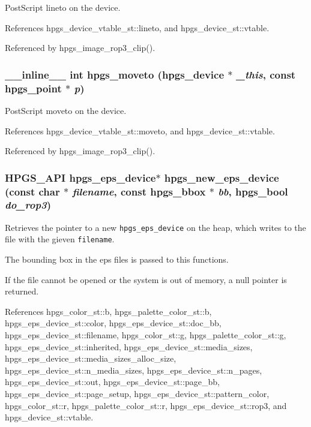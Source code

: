 PostScript lineto on the device. 

References hpgs\_\-device\_\-vtable\_\-st::lineto, and hpgs\_\-device\_\-st::vtable.

Referenced by hpgs\_\-image\_\-rop3\_\-clip().
\subsubsection[hpgs\_\-moveto]{\setlength{\rightskip}{0pt plus 5cm}\_\-\_\-inline\_\-\_\- int hpgs\_\-moveto ({\bf hpgs\_\-device} $\ast$ {\em \_\-this}, \/  const {\bf hpgs\_\-point} $\ast$ {\em p})\hspace{0.3cm}{\tt  [static]}}\label{group__device_g02a5a6a75d00357beafb93105f1b2d87}


PostScript moveto on the device. 

References hpgs\_\-device\_\-vtable\_\-st::moveto, and hpgs\_\-device\_\-st::vtable.

Referenced by hpgs\_\-image\_\-rop3\_\-clip().
\subsubsection[hpgs\_\-new\_\-eps\_\-device]{\setlength{\rightskip}{0pt plus 5cm}HPGS\_\-API {\bf hpgs\_\-eps\_\-device}$\ast$ hpgs\_\-new\_\-eps\_\-device (const char $\ast$ {\em filename}, \/  const {\bf hpgs\_\-bbox} $\ast$ {\em bb}, \/  hpgs\_\-bool {\em do\_\-rop3})}\label{group__device_g576f0a343948b709f8099bb0ec668ef6}


Retrieves the pointer to a new {\tt hpgs\_\-eps\_\-device} on the heap, which writes to the file with the gieven {\tt filename}.

The bounding box in the eps files is passed to this functions.

If the file cannot be opened or the system is out of memory, a null pointer is returned. 

References hpgs\_\-color\_\-st::b, hpgs\_\-palette\_\-color\_\-st::b, hpgs\_\-eps\_\-device\_\-st::color, hpgs\_\-eps\_\-device\_\-st::doc\_\-bb, hpgs\_\-eps\_\-device\_\-st::filename, hpgs\_\-color\_\-st::g, hpgs\_\-palette\_\-color\_\-st::g, hpgs\_\-eps\_\-device\_\-st::inherited, hpgs\_\-eps\_\-device\_\-st::media\_\-sizes, hpgs\_\-eps\_\-device\_\-st::media\_\-sizes\_\-alloc\_\-size, hpgs\_\-eps\_\-device\_\-st::n\_\-media\_\-sizes, hpgs\_\-eps\_\-device\_\-st::n\_\-pages, hpgs\_\-eps\_\-device\_\-st::out, hpgs\_\-eps\_\-device\_\-st::page\_\-bb, hpgs\_\-eps\_\-device\_\-st::page\_\-setup, hpgs\_\-eps\_\-device\_\-st::pattern\_\-color, hpgs\_\-color\_\-st::r, hpgs\_\-palette\_\-color\_\-st::r, hpgs\_\-eps\_\-device\_\-st::rop3, and hpgs\_\-device\_\-st::vtable.
